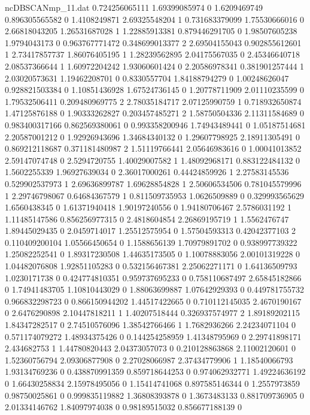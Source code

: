 \begin{filecontents}{ncDBSCANmp_11.dat}
0.724256065111 1.69399085974 0
1.6209469749 0.896305565582 0
1.4108249871 2.69325548204 1
0.731683379099 1.75530666016 0
2.66818043205 1.26531687028 1
1.22885913381 0.879446291705 0
1.98507605238 1.9794043173 0
0.963767771472 0.348699013377 2
2.69504155043 0.902855612601 1
2.73417857737 1.86076405195 1
1.28239562895 2.04175567035 0
2.45346640718 2.08537366644 1
1.60972204242 1.93060601424 0
2.20586978341 0.381901257444 1
2.03020573631 1.19462208701 0
0.8330557704 1.84188794279 0
1.00248626047 0.928821503384 0
1.10851436928 1.67524736145 0
1.20778711909 2.01110235599 0
1.79532506411 0.209480969775 2
2.78035184717 2.07125990759 1
0.718932650874 1.47125876188 0
1.90333262827 0.203457485271 2
1.58750504336 2.11311584689 0
0.983400317166 0.862569380061 0
0.993358200946 1.74943489441 0
1.05187514681 2.20587001212 0
1.92926943696 1.34684340132 0
1.29607798925 2.18911305491 0
0.869212118687 0.371181480987 2
1.51119766441 2.05646983616 0
1.00041013852 2.59147074748 0
2.5294720755 1.40029007582 1
1.48092968171 0.883122484132 0
1.5602255339 1.96927639034 0
2.36017000261 0.44424859926 1
2.27583145536 0.529902537973 1
2.69636899787 1.69628854828 1
2.50606534506 0.781045579996 1
2.29746798067 0.64684367579 1
0.811509735953 1.0626509889 0
0.329993565629 1.6560438345 0
1.61371940418 1.90197240556 0
1.94180706467 2.5786031192 1
1.11485147586 0.856256977315 0
2.4818604854 2.26869195719 1
1.5562476747 1.89445029435 0
2.0459714017 1.25512575954 0
1.57504593313 0.42042377103 2
0.110409200104 1.05566450654 0
1.1588656139 1.70979891702 0
0.938997739322 1.25082252541 0
1.89317230508 1.44635173505 0
1.10078883056 2.00101319228 0
1.04482076808 1.92851105283 0
0.532156467381 2.25062271171 0
1.64136509793 1.0230171738 0
0.424774810351 0.959737695233 0
0.758110687497 2.65845182866 0
1.74941483705 1.10810443029 0
1.88063699887 1.07642929393 0
0.449781755732 0.966832298723 0
0.866150944202 1.44517422665 0
0.710112145035 2.4670190167 0
2.6476290898 2.10447818211 1
1.40207518444 0.326937574977 2
1.89189202115 1.84347282517 0
2.74510576096 1.38542766466 1
1.7682936266 2.24234071104 0
0.571174079272 1.48934375426 0
0.144254258959 1.41348795969 0
2.29741898171 2.434682753 1
1.44780820443 2.04373057073 0
0.210128863868 2.11002120601 0
1.52360756794 2.09306877908 0
2.27028066987 2.37434779906 1
1.18540066793 1.93134769236 0
0.438870991359 0.859718644253 0
0.974062932771 1.49224636192 0
1.66430258834 2.15978495056 0
1.15414741068 0.897585146344 0
1.2557973859 0.98750025861 0
0.999835119882 1.36808393878 0
1.3673483133 0.881709736905 0
2.01334146762 1.84097974038 0
0.98189515032 0.856677188139 0

\end{filecontents}
